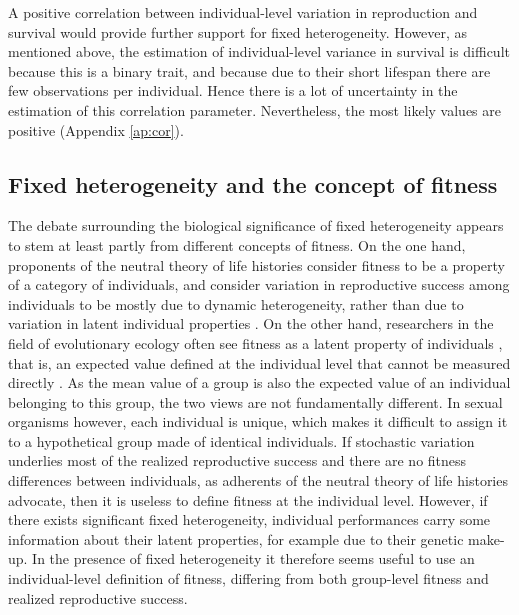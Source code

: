 A positive correlation between individual-level variation in reproduction and survival would provide further support for fixed heterogeneity. However, as mentioned above, the estimation of individual-level variance in survival is difficult because this is a binary trait, and because due to their short lifespan there are few observations per individual. Hence there is a lot of uncertainty in the estimation of this correlation parameter. Nevertheless, the most likely values are positive (Appendix \ref{ap:cor}).

\subsection{Fixed heterogeneity and the concept of fitness}
The debate surrounding the biological significance of fixed heterogeneity appears to stem at least partly from different concepts of fitness. On the one hand, proponents of the neutral theory of life histories consider fitness to be a property of a category of individuals, and consider variation in reproductive success among individuals to be mostly due to dynamic heterogeneity, rather than due to variation in latent individual properties \parencite{Steiner2012}. On the other hand, researchers in the field of evolutionary ecology often see fitness as a latent property of individuals \parencite{Cam2000}, that is, an expected value defined at the individual level that cannot be measured directly \parencite{Brandon1984,Price1996,Krimbas2004}. 
As the mean value of a group is also the expected value of an individual belonging to this group, the two views are not fundamentally different. In sexual organisms however, each individual is unique, which makes it difficult to assign it to a hypothetical group made of identical individuals. If stochastic variation underlies most of the realized reproductive success and there are no fitness differences between individuals, as adherents of the neutral theory of life histories advocate, then it is useless to define fitness at the individual level. However, if there exists significant fixed heterogeneity, individual performances carry some information about their latent properties, for example due to their genetic make-up. In the presence of fixed heterogeneity it therefore seems useful to use an individual-level definition of fitness, differing from both group-level fitness and realized reproductive success.

